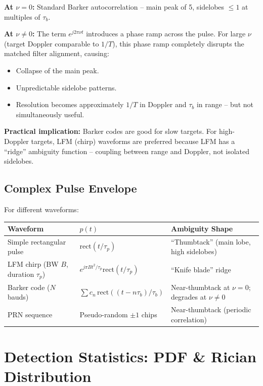 \documentclass[10pt,letterpaper]{article}
\begin{document}
\textbf{At $\nu=0$:} Standard Barker autocorrelation -- main peak of 5, sidelobes $\leq 1$ at multiples of $\tau_b$.

\textbf{At $\nu\neq0$:} The term $e^{j2\pi\nu t}$ introduces a phase ramp across the pulse. For large $\nu$ (target Doppler comparable to $1/T$), this phase ramp completely disrupts the matched filter alignment, causing:
\begin{itemize}[noitemsep]
  \item Collapse of the main peak.
  \item Unpredictable sidelobe patterns.
  \item Resolution becomes approximately $1/T$ in Doppler and $\tau_b$ in range -- but not simultaneously useful.
\end{itemize}

\textbf{Practical implication:} Barker codes are good for slow targets. For high-Doppler targets, LFM (chirp) waveforms are preferred because LFM has a ``ridge'' ambiguity function -- coupling between range and Doppler, not isolated sidelobes.

\subsection{Complex Pulse Envelope}

For different waveforms:
\begin{center}
\begin{tabular}{lll}
\toprule
\textbf{Waveform} & \textbf{$p(t)$} & \textbf{Ambiguity Shape} \\
\midrule
Simple rectangular pulse & $\mathrm{rect}(t/\tau_p)$ & ``Thumbtack'' (main lobe, high sidelobes) \\
LFM chirp (BW $B$, duration $\tau_p$) & $e^{j\pi B t^2/\tau_p}\mathrm{rect}(t/\tau_p)$ & ``Knife blade'' ridge \\
Barker code ($N$ bauds) & $\sum c_n\,\mathrm{rect}((t-n\tau_b)/\tau_b)$ & Near-thumbtack at $\nu=0$; degrades at $\nu\neq0$ \\
PRN sequence & Pseudo-random $\pm1$ chips & Near-thumbtack (periodic correlation) \\
\bottomrule
\end{tabular}
\end{center}

\section{Detection Statistics: PDF \& Rician Distribution}
\end{document}
